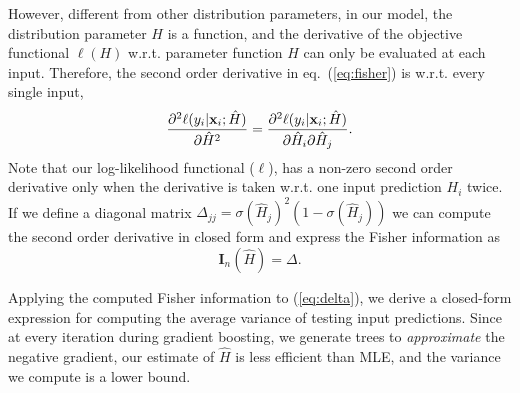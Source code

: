 However, different from other distribution parameters, in our model, the distribution parameter $H$ is a function, and the derivative of the objective functional $\ell(H)$ w.r.t. parameter function $H$ can only be evaluated at each input. Therefore, the second order derivative in eq.~(\ref{eq:fisher}) is w.r.t. every single input,
\begin{align}
    \frac{\partial^2 \ell (y_i|\mathbf{x}_i;\hat{H})}{\partial \hat{H}^2} = \frac{\partial^2 \ell(y_i|\mathbf{x}_i;\hat{H})}{\partial \hat{H}_i \partial \hat{H}_j}.
    \label{eq:secondorder}
\end{align}
Note that our log-likelihood functional ($\ell$), has
a non-zero second order derivative only when the derivative is taken w.r.t. one input prediction $H_i$ twice. If we define a diagonal matrix $\Delta_{jj}=\sigma(\hat{H}_j)^2(1-\sigma(\hat{H}_j))$ we can compute the second order derivative in closed form and express the Fisher information as
\begin{equation}
  \mathbf{I}_n(\hat{H})= \Delta. \label{eq:fishermatrix}
\end{equation}
%

Applying the computed Fisher information to (\ref{eq:delta}), we derive a closed-form expression for computing the average variance of testing input predictions. Since at every iteration during gradient boosting, we generate trees to \emph{approximate} the negative gradient, our estimate of $\hat{H}$ is less efficient than MLE, and the variance we compute is a lower bound.


